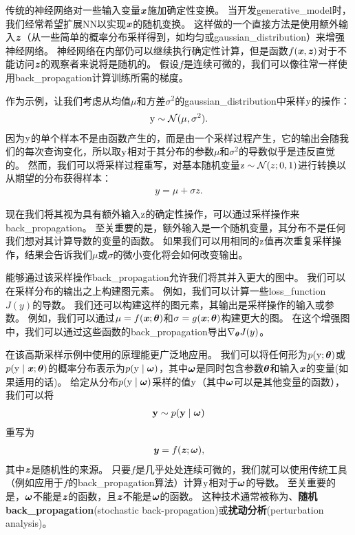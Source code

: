传统的神经网络对一些输入变量$\boldsymbol{\mathit{x}}$施加确定性变换。
当开发\gls{generative_model}时，我们经常希望扩展\gls{NN}以实现$\boldsymbol{\mathit{x}}$的随机变换。
这样做的一个直接方法是使用额外输入$\boldsymbol{\mathit{z}}$（从一些简单的概率分布采样得到，如均匀或\gls{gaussian_distribution}）来增强神经网络。
神经网络在内部仍可以继续执行确定性计算，但是函数$f(\boldsymbol{\mathit{x}},\boldsymbol{\mathit{z}})$对于不能访问$\boldsymbol{\mathit{z}}$的观察者来说将是随机的。
假设$f$是连续可微的，我们可以像往常一样使用\gls{back_propagation}计算训练所需的梯度。

作为示例，让我们考虑从均值$\mu$和方差$\sigma^2$的\gls{gaussian_distribution}中采样$\mathrm{y}$的操作：
\begin{align}
 \mathrm{y} \sim \mathcal{N}(\mu, \sigma^2).
\end{align}
因为$\mathrm{y}$的单个样本不是由函数产生的，而是由一个采样过程产生，它的输出会随我们的每次查询变化，所以取$\mathrm{y}$相对于其分布的参数$\mu$和$\sigma^2$的导数似乎是违反直觉的。
然而，我们可以将采样过程重写，对基本随机变量$\mathrm{z} \sim \mathcal{N}(z;0,1)$进行转换以从期望的分布获得样本：
\begin{align}
 y = \mu + \sigma z.
\end{align}

现在我们将其视为具有额外输入$\mathrm{z}$的确定性操作，可以通过采样操作来\gls{back_propagation}。
至关重要的是，额外输入是一个随机变量，其分布不是任何我们想对其计算导数的变量的函数。
如果我们可以用相同的$\mathrm{z}$值再次重复采样操作，结果会告诉我们$\mu$或$\sigma$的微小变化将会如何改变输出。


能够通过该采样操作\gls{back_propagation}允许我们将其并入更大的图中。
我们可以在采样分布的输出之上构建图元素。
例如，我们可以计算一些\gls{loss_function}$J(y)$的导数。
我们还可以构建这样的图元素，其输出是采样操作的输入或参数。
例如，我们可以通过$\mu = f(\boldsymbol{\mathit{x}}; \boldsymbol{\theta})$和$\sigma = g(\boldsymbol{\mathit{x}}; \boldsymbol{\theta})$构建更大的图。
在这个增强图中，我们可以通过这些函数的\gls{back_propagation}导出$\nabla_{\boldsymbol{\theta}} J(y)$。

在该高斯采样示例中使用的原理能更广泛地应用。
我们可以将任何形为$p(\mathrm{y};\boldsymbol{\theta})$或$p(\mathrm{y} \mid \boldsymbol{\mathit{x}};\boldsymbol{\theta})$的概率分布表示为$p(\mathrm{y} \mid \boldsymbol{\omega})$，其中$\boldsymbol{\omega}$是同时包含参数$\boldsymbol{\theta}$和输入$\boldsymbol{\mathit{x}}$的变量(如果适用的话)。
给定从分布$p(\mathrm{y} \mid \boldsymbol{\omega})$采样的值$\mathrm{y}$（其中$\boldsymbol{\omega}$可以是其他变量的函数），我们可以将
\begin{align}
 \mathbf{y} \sim p(\mathbf{y}  \mid  \boldsymbol{\omega})
\end{align}
重写为
\begin{align}
 \boldsymbol{\mathit{y}} = f(\boldsymbol{\mathit{z}}; \boldsymbol{\omega}),
\end{align}
其中$\boldsymbol{\mathit{z}}$是随机性的来源。
只要$f$是几乎处处连续可微的，我们就可以使用传统工具（例如应用于$f$的\gls{back_propagation}算法）计算$\mathrm{y}$相对于$\boldsymbol{\omega}$的导数。
至关重要的是，$\boldsymbol{\omega}$不能是$\boldsymbol{\mathit{z}}$的函数，且$\boldsymbol{\mathit{z}}$不能是$\boldsymbol{\omega}$的函数。
这种技术通常被称为、\textbf{随机\gls{back_propagation}}(stochastic back-propagation)或\textbf{扰动分析}(perturbation analysis)。


